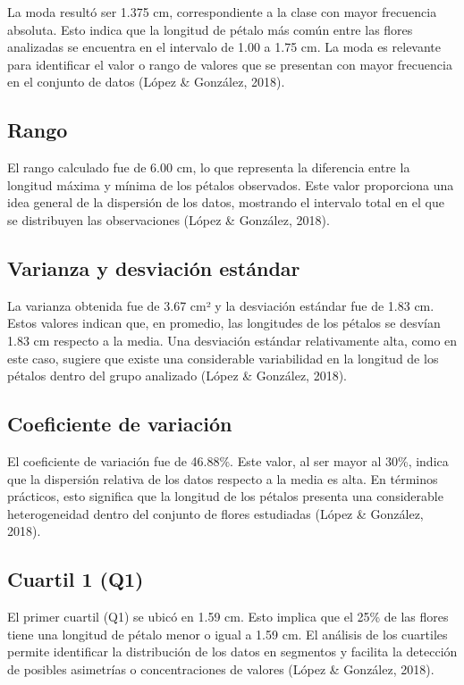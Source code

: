\documentclass[
  spanish,
  letterpaper,
]{book}
\begin{document}
La moda resultó ser 1.375 cm, correspondiente a la clase con mayor
frecuencia absoluta. Esto indica que la longitud de pétalo más común
entre las flores analizadas se encuentra en el intervalo de 1.00 a 1.75
cm. La moda es relevante para identificar el valor o rango de valores
que se presentan con mayor frecuencia en el conjunto de datos (López \&
González, 2018).

\subsection{Rango}\label{rango-4}

El rango calculado fue de 6.00 cm, lo que representa la diferencia entre
la longitud máxima y mínima de los pétalos observados. Este valor
proporciona una idea general de la dispersión de los datos, mostrando el
intervalo total en el que se distribuyen las observaciones (López \&
González, 2018).

\subsection{Varianza y desviación
estándar}\label{varianza-y-desviaciuxf3n-estuxe1ndar}

La varianza obtenida fue de 3.67 cm² y la desviación estándar fue de
1.83 cm. Estos valores indican que, en promedio, las longitudes de los
pétalos se desvían 1.83 cm respecto a la media. Una desviación estándar
relativamente alta, como en este caso, sugiere que existe una
considerable variabilidad en la longitud de los pétalos dentro del grupo
analizado (López \& González, 2018).

\subsection{Coeficiente de
variación}\label{coeficiente-de-variaciuxf3n-4}

El coeficiente de variación fue de 46.88\%. Este valor, al ser mayor al
30\%, indica que la dispersión relativa de los datos respecto a la media
es alta. En términos prácticos, esto significa que la longitud de los
pétalos presenta una considerable heterogeneidad dentro del conjunto de
flores estudiadas (López \& González, 2018).

\subsection{Cuartil 1 (Q1)}\label{cuartil-1-q1}

El primer cuartil (Q1) se ubicó en 1.59 cm. Esto implica que el 25\% de
las flores tiene una longitud de pétalo menor o igual a 1.59 cm. El
análisis de los cuartiles permite identificar la distribución de los
datos en segmentos y facilita la detección de posibles asimetrías o
concentraciones de valores (López \& González, 2018).
\end{document}
